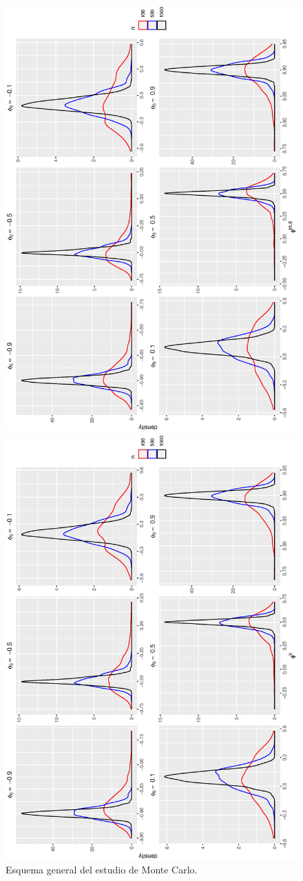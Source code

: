 \begin{figure}[h]
    \begin{minipage}{0.45\textwidth}
    \includegraphics[width=0.8\linewidth,angle = 270]{Kap3/Fig_Cap3/sim3.eps}
    \caption{Esquema general del estudio de Monte Carlo.}
    \label{fig:monte_carlo_res1}
    \end{minipage}
    \hfill
    \begin{minipage}{0.45\textwidth}
    \includegraphics[width=0.8\linewidth,angle = 270]{Kap3/Fig_Cap3/sim4.eps}

\end{minipage}
\end{figure}
